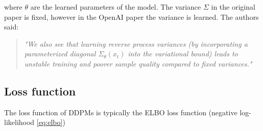 where $\theta$ are the learned parameters of the model. The variance $\Sigma$ in the original paper \cite{ddpm} is fixed, however in the OpenAI paper \cite{openai_improved_ddpm} the variance is learned. The authors said:

\begin{quote}
    \textit{"We also see that learning reverse process variances (by incorporating a parameterized diagonal $\Sigma_\theta(x_t)$ into the variational bound) leads to unstable training and poorer sample quality compared to fixed variances."} \cite{ddpm}
\end{quote}






\subsection{Loss function}

The loss function of DDPMs is typically the ELBO loss function (negative log-likelihood \ref{eq:elbo}) 
